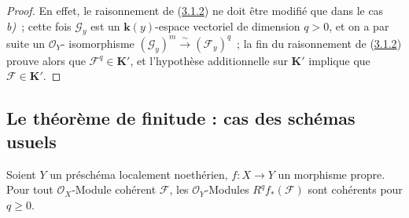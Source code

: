 \begin{proof}
En effet, le raisonnement de (\hyperref[III.3.1.2-fr]{3.1.2}) ne doit être
modifié que dans le cas \textit{b)}~; cette fois $\mathcal G_y$ est un $\boldsymbol{k}(y)$-espace
vectoriel de dimension $q>0$, et on a par suite un $\mathcal O_Y$-%
isomorphisme $(\mathcal G_y)^m\xrightarrow{\sim}(\mathcal F_y)^q$~; la fin
du raisonnement de (\hyperref[III.3.1.2-fr]{3.1.2}) prouve alors que
$\mathcal F^q\in\boldsymbol{K}'$, et l'hypothèse additionnelle sur $\boldsymbol{K}'$ implique que
$\mathcal F\in\boldsymbol{K}'$.
\end{proof}

\subsection{Le théorème de finitude : cas des schémas usuels}
\label{subsection:III.3.2-fr}

\begin{theorem}[3.2.1]
\label{III.3.2.1-fr}
Soient $Y$ un préschéma localement noethérien, $f:X\to Y$ un morphisme
propre. Pour tout $\mathcal O_X$-Module cohérent $\mathcal F$, les
$\mathcal O_Y$-Modules $R^qf_*(\mathcal F)$ sont cohérents pour $q\geq0$.
\end{theorem}


